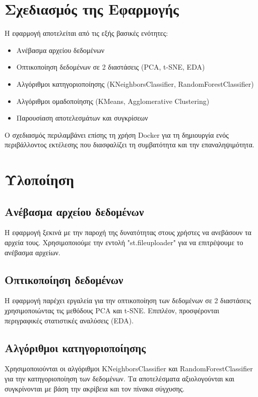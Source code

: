 \documentclass[a4paper,12pt]{article}
\begin{document}
\section{Σχεδιασμός της Εφαρμογής}
\label{sec:design}
Η εφαρμογή αποτελείται από τις εξής βασικές ενότητες:
\begin{itemize}
    \item Ανέβασμα αρχείου δεδομένων
    \item Οπτικοποίηση δεδομένων σε 2 διαστάσεις (\textlatin{PCA}, \textlatin{t-SNE}, \textlatin{EDA})
    \item Αλγόριθμοι κατηγοριοποίησης (\textlatin{KNeighborsClassifier}, \textlatin{RandomForestClassifier})
    \item Αλγόριθμοι ομαδοποίησης (\textlatin{KMeans}, \textlatin{Agglomerative Clustering})
    \item Παρουσίαση αποτελεσμάτων και συγκρίσεων
\end{itemize}
Ο σχεδιασμός περιλαμβάνει επίσης τη χρήση \textlatin{Docker} για τη δημιουργία ενός περιβάλλοντος εκτέλεσης που διασφαλίζει τη συμβατότητα και την επαναληψιμότητα.

\section{Υλοποίηση}

\subsection{Ανέβασμα αρχείου δεδομένων}
Η εφαρμογή ξεκινά με την παροχή της δυνατότητας στους χρήστες να ανεβάσουν τα αρχεία τους. Χρησιμοποιούμε την εντολή \textlatin{"st.fileuploader"} για να επιτρέψουμε το ανέβασμα αρχείων.

\subsection{Οπτικοποίηση δεδομένων}
Η εφαρμογή παρέχει εργαλεία για την οπτικοποίηση των δεδομένων σε 2 διαστάσεις χρησιμοποιώντας τις μεθόδους \textlatin{PCA} και \textlatin{t-SNE}. Επιπλέον, προσφέρονται περιγραφικές στατιστικές αναλύσεις (\textlatin{EDA}).

\subsection{Αλγόριθμοι κατηγοριοποίησης}
Χρησιμοποιούνται οι αλγόριθμοι \textlatin{KNeighborsClassifier} και \textlatin{RandomForestClassifier} για την κατηγοριοποίηση των δεδομένων. Τα αποτελέσματα αξιολογούνται και συγκρίνονται με βάση την ακρίβεια και τον πίνακα σύγχυσης.
\end{document}
